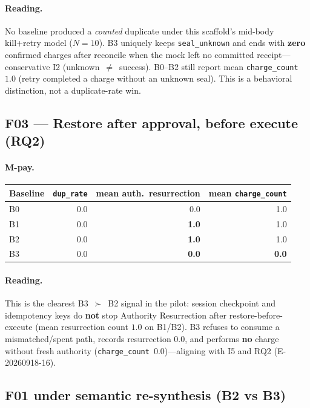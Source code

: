 \documentclass[11pt,a4paper]{article}
\begin{document}
\paragraph{Reading.}
No baseline produced a \emph{counted} duplicate under this scaffold's
mid-body kill+retry model ($N{=}10$). B3 uniquely keeps
\texttt{seal\_unknown} and ends with \textbf{zero} confirmed charges after
reconcile when the mock left no committed receipt---conservative I2
(unknown~$\neq$~success). B0--B2 still report mean \texttt{charge\_count}
$1.0$ (retry completed a charge without an unknown seal). This is a
behavioral distinction, not a duplicate-rate win.

\subsection{F03 --- Restore after approval, before execute (RQ2)}

\paragraph{M-pay.}

\begin{center}
\begin{tabular}{@{}lrrr@{}}
\toprule
Baseline & \texttt{dup\_rate} & mean auth.\ resurrection &
  mean \texttt{charge\_count} \\
\midrule
B0 & 0.0 & 0.0 & 1.0 \\
B1 & 0.0 & \textbf{1.0} & 1.0 \\
B2 & 0.0 & \textbf{1.0} & 1.0 \\
B3 & 0.0 & \textbf{0.0} & \textbf{0.0} \\
\bottomrule
\end{tabular}
\end{center}

\paragraph{Reading.}
This is the clearest B3~$\succ$~B2 signal in the pilot: session checkpoint
and idempotency keys do \textbf{not} stop Authority Resurrection after
restore-before-execute (mean resurrection count $1.0$ on B1/B2). B3 refuses
to consume a mismatched/spent path, records resurrection $0.0$, and
performs \textbf{no} charge without fresh authority
(\texttt{charge\_count}~$0.0$)---aligning with I5 and RQ2
(E-20260918-16).

\subsection{F01 under semantic re-synthesis (B2 vs B3)}
\end{document}
